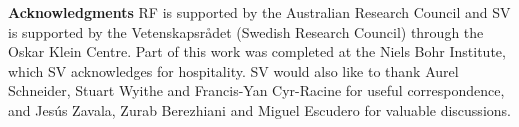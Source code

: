 \documentclass[12pt]{article}
\begin{document}
%

\vskip 1cm

\noindent
{\large \bf Acknowledgments}
\vskip 0.2cm
\noindent
RF is supported by the Australian Research Council and SV is supported by the Vetenskapsr\r{a}det (Swedish Research Council) 
through the Oskar Klein Centre. Part of this work was completed at the Niels Bohr Institute, which SV acknowledges for 
hospitality. SV would also like to thank Aurel Schneider, Stuart Wyithe and Francis-Yan Cyr-Racine for useful correspondence, 
and Jes\'{u}s Zavala, Zurab Berezhiani and Miguel Escudero for valuable discussions.


%
%



{\small 

}
\end{document}
